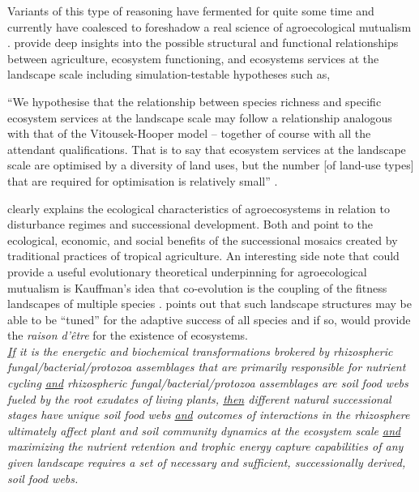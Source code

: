 Variants of this type of reasoning have fermented for quite some time and currently have coalesced to foreshadow a real science of agroecological mutualism \citep{swift_biodiversity_2004, gliessman_agroecology:_2015}. \citet{swift_biodiversity_2004} provide deep insights into the possible structural and functional relationships between agriculture, ecosystem functioning, and ecosystems services at the landscape scale including simulation-testable hypotheses such as,
\begin{myindentpar}{2em}
\enquote{We hypothesise that the relationship between species richness and specific ecosystem services at the landscape scale may follow a relationship analogous with that of the Vitousek-Hooper model -- together of course with all the attendant qualifications. That is to say that ecosystem services at the landscape scale are optimised by a diversity of land uses, but the number [of land-use types] that are required for optimisation is relatively small} \citep{swift_biodiversity_2004}.
\end{myindentpar}
\citet{gliessman_agroecology:_2015} clearly explains the ecological characteristics of agroecosystems in relation to disturbance regimes and successional development.  Both \citet{swift_biodiversity_2004} and \citet{gliessman_agroecology:_2015} point to the ecological, economic, and social benefits of the successional mosaics created by traditional practices of tropical agriculture. An interesting side note that could provide a useful evolutionary theoretical underpinning for agroecological mutualism is Kauffman's idea that co-evolution is the coupling of the fitness landscapes of multiple species \citep{kauffman_origins_1993}. \citet{kauffman_origins_1993} points out that such landscape structures may be able to be \enquote{tuned} for the adaptive success of all species and if so, would provide the \textit{raison d'\^{e}tre} for the existence of ecosystems.\\

\textit{\underline{If} it is the energetic and biochemical transformations brokered by rhizospheric fungal/bacterial/protozoa assemblages that are primarily responsible for nutrient cycling \underline{and} rhizospheric fungal/bacterial/protozoa assemblages are soil food webs fueled by the root exudates of living plants, \underline{then} different natural successional stages have unique soil food webs \underline{and} outcomes of interactions in the rhizosphere ultimately affect plant and soil community dynamics at the ecosystem scale \underline{and} maximizing the nutrient retention and trophic energy capture capabilities of any given landscape requires a set of necessary and sufficient, successionally derived, soil food webs.}\\

